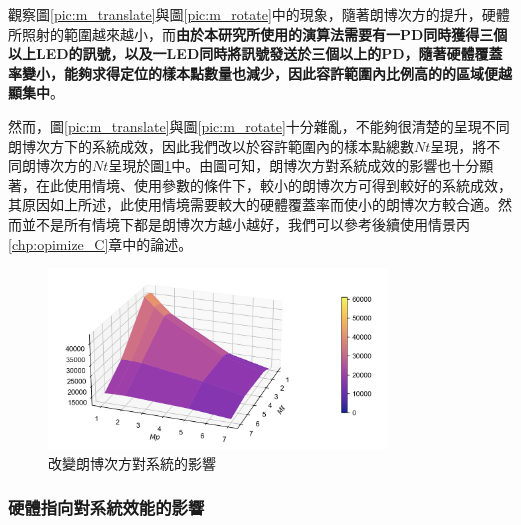 觀察圖\ref{pic:m_translate}與圖\ref{pic:m_rotate}中的現象，隨著朗博次方的提升，硬體所照射的範圍越來越小，而\textbf{由於本研究所使用的演算法需要有一PD同時獲得三個以上LED的訊號，以及一LED同時將訊號發送於三個以上的PD，隨著硬體覆蓋率變小，能夠求得定位的樣本點數量也減少，因此容許範圍內比例高的的區域便越顯集中}。



然而，圖\ref{pic:m_translate}與圖\ref{pic:m_rotate}十分雜亂，不能夠很清楚的呈現不同朗博次方下的系統成效，因此我們改以於容許範圍內的樣本點總數$Nt$呈現，將不同朗博次方的$Nt$呈現於圖\ref{pic:m alpha50 surface}中。由圖可知，朗博次方對系統成效的影響也十分顯著，在此使用情境、使用參數的條件下，較小的朗博次方可得到較好的系統成效，其原因如上所述，此使用情境需要較大的硬體覆蓋率而使小的朗博次方較合適。然而並不是所有情境下都是朗博次方越小越好，我們可以參考後續使用情景丙\ref{chp:opimize_C}章中的論述。

\begin{figure}[htpb]
    \centering
    \includegraphics[width=9cm]{ch4pic/m alpha50 surface.png}
    \caption{改變朗博次方對系統的影響}
    \label{pic:m alpha50 surface}
\end{figure}










\subsubsection{硬體指向對系統效能的影響}
\label{chp:orient_effect}

